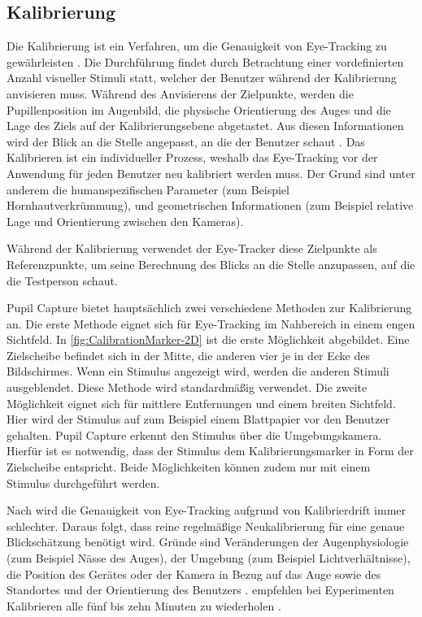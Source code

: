 \subsection{Kalibrierung}
Die Kalibrierung ist ein Verfahren, um die Genauigkeit von Eye-Tracking zu gewährleisten \cite{Clay_Koenig_Koenig_2019}. Die Durchführung findet durch Betrachtung einer vordefinierten Anzahl visueller Stimuli statt, welcher der Benutzer während der Kalibrierung anvisieren muss. Während des Anvisierens der Zielpunkte, werden die Pupillenposition im Augenbild, die physische Orientierung des Auges und die Lage des Ziels auf der Kalibrierungsebene abgetastet. \cite{Lander.2018} Aus diesen Informationen wird der Blick an die Stelle angepasst, an die der Benutzer schaut \cite{Clay_Koenig_Koenig_2019}. Das Kalibrieren ist ein individueller Prozess, weshalb das Eye-Tracking vor der Anwendung für jeden Benutzer neu kalibriert werden muss. Der Grund sind unter anderem die humanspezifischen Parameter (zum Beispiel Hornhautverkrümmung), und geometrischen Informationen (zum Beispiel relative Lage und Orientierung zwischen den Kameras). \cite{Lander.2018}

Während der Kalibrierung verwendet der Eye-Tracker diese Zielpunkte als Referenzpunkte, um seine Berechnung des Blicks an die Stelle anzupassen, auf die die Testperson schaut. 

Pupil Capture bietet hauptsächlich zwei verschiedene Methoden zur Kalibrierung an. Die erste Methode eignet sich für Eye-Tracking im Nahbereich in einem engen Sichtfeld. In \autoref{fig:CalibrationMarker-2D} ist die erste Möglichkeit abgebildet. Eine Zielscheibe befindet sich in der Mitte, die anderen vier je in der Ecke des Bildschirmes. Wenn ein Stimulus angezeigt wird, werden die anderen Stimuli ausgeblendet. Diese Methode wird standardmäßig verwendet. Die zweite Möglichkeit eignet sich für mittlere Entfernungen und einem breiten Sichtfeld. Hier wird der Stimulus auf zum Beispiel einem Blattpapier vor den Benutzer gehalten. Pupil Capture erkennt den Stimulus über die Umgebungskamera. Hierfür ist es notwendig, dass der Stimulus dem Kalibrierungsmarker in Form der Zielscheibe entspricht. Beide Möglichkeiten können zudem nur mit einem Stimulus durchgeführt werden. \cite{PupilLabsCalib}

Nach \citeauthor{Lander.2018} wird die Genauigkeit von Eye-Tracking aufgrund von Kalibrierdrift immer schlechter. Daraus folgt, dass reine regelmäßige Neukalibrierung für eine genaue Blickschätzung benötigt wird. \cite{Lander.2018} Gründe sind Veränderungen der Augenphysiologie (zum Beispiel Nässe des Auges), der Umgebung (zum Beispiel Lichtverhältnisse), die Position des Gerätes oder der Kamera in Bezug auf das Auge sowie des Standortes und der Orientierung des Benutzers \cite{Cerrolaza.2012}. \citeauthor{Clay_Koenig_Koenig_2019} empfehlen bei Eyperimenten Kalibrieren alle fünf bis zehn Minuten zu wiederholen \cite{Clay_Koenig_Koenig_2019}. 

